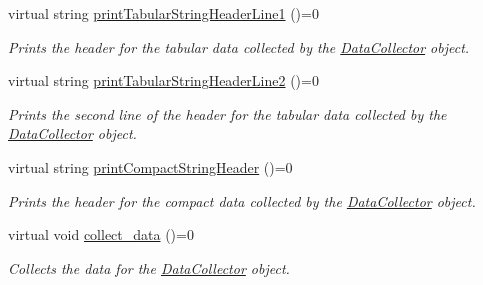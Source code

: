 \begin{DoxyCompactItemize}
virtual string \mbox{\hyperlink{classDataCollector_a91619cfa9e9b8cefd2f7c20d5718b41e}{print\+Tabular\+String\+Header\+Line1}} ()=0
\begin{DoxyCompactList}\small\item\em Prints the header for the tabular data collected by the \mbox{\hyperlink{classDataCollector}{Data\+Collector}} object. \end{DoxyCompactList}\item 
virtual string \mbox{\hyperlink{classDataCollector_af01ea961314be2164f39e6d4cd59e443}{print\+Tabular\+String\+Header\+Line2}} ()=0
\begin{DoxyCompactList}\small\item\em Prints the second line of the header for the tabular data collected by the \mbox{\hyperlink{classDataCollector}{Data\+Collector}} object. \end{DoxyCompactList}\item 
virtual string \mbox{\hyperlink{classDataCollector_a98dcb4ec871d9c7fbf7545c64e5ccc67}{print\+Compact\+String\+Header}} ()=0
\begin{DoxyCompactList}\small\item\em Prints the header for the compact data collected by the \mbox{\hyperlink{classDataCollector}{Data\+Collector}} object. \end{DoxyCompactList}\item 
virtual void \mbox{\hyperlink{classDataCollector_a01486bf58acbe37b203f97b3b9a79c40}{collect\+\_\+data}} ()=0
\begin{DoxyCompactList}\small\item\em Collects the data for the \mbox{\hyperlink{classDataCollector}{Data\+Collector}} object. \end{DoxyCompactList}\end{DoxyCompactItemize}
